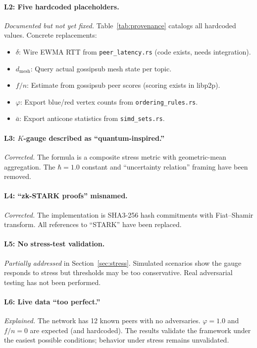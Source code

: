 \documentclass[11pt,a4paper]{article}
\begin{document}
\paragraph{L2: Five hardcoded placeholders.} \emph{Documented but not yet fixed.} Table~\ref{tab:provenance} catalogs all hardcoded values. Concrete replacements:
\begin{itemize}[nosep]
    \item $\delta$: Wire EWMA RTT from \texttt{peer\_latency.rs} (code exists, needs integration).
    \item $d_{\text{mesh}}$: Query actual gossipsub mesh state per topic.
    \item $f/n$: Estimate from gossipsub peer scores (scoring exists in libp2p).
    \item $\varphi$: Export blue/red vertex counts from \texttt{ordering\_rules.rs}.
    \item $\bar{a}$: Export anticone statistics from \texttt{simd\_sets.rs}.
\end{itemize}

\paragraph{L3: $K$-gauge described as ``quantum-inspired.''} \emph{Corrected.} The formula is a composite stress metric with geometric-mean aggregation. The $\hbar = 1.0$ constant and ``uncertainty relation'' framing have been removed.

\paragraph{L4: ``zk-STARK proofs'' misnamed.} \emph{Corrected.} The implementation is SHA3-256 hash commitments with Fiat--Shamir transform. All references to ``STARK'' have been replaced.

\paragraph{L5: No stress-test validation.} \emph{Partially addressed} in Section~\ref{sec:stress}. Simulated scenarios show the gauge responds to stress but thresholds may be too conservative. Real adversarial testing has not been performed.

\paragraph{L6: Live data ``too perfect.''} \emph{Explained.} The network has 12 known peers with no adversaries. $\varphi = 1.0$ and $f/n = 0$ are expected (and hardcoded). The results validate the framework under the easiest possible conditions; behavior under stress remains unvalidated.
\end{document}
